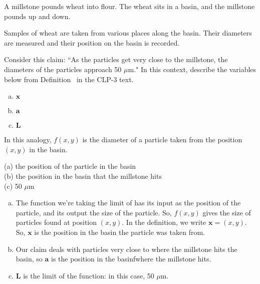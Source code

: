 \begin{question}
A millstone pounds wheat into flour. The wheat sits in a basin, and the millstone pounds up and down.

Samples of wheat are taken from various places along the basin. Their diameters are measured and their position on the basin is recorded.

Consider this claim: ``As the particles get very close to the millstone, the diameters of the particles approach 50 $\mu$m."
In this context, describe the variables below from Definition~ in the CLP-3 text.

\begin{enumerate}[(a)]
\item $\mathbf x$
\item $\mathbf a$
\item $\mathbf L$
\end{enumerate}
\end{question}
\begin{hint}
In this analogy, $f(x,y)$ is the diameter of a particle taken from the position $(x,y)$ in the basin.
\end{hint}
\begin{answer}
(a) the position of the particle in the basin \\
(b) the position in the basin that the millstone hits\\
(c) 50 $\mu$m
\end{answer}
\begin{solution}

\begin{enumerate}[(a)]
\item The function we're taking the limit of has its input as the position of the particle, and its output the size of the particle. So, $f(x,y)$ gives the size of particles found at position $(x,y)$. In the definition, we write $\mathbf x = (x,y)$. So, $\mathbf x$ is the position in the basin the particle was taken from.
\item Our claim deals with particles very close to where the millstone hits the basin, so $\mathbf a$ is the position in the basinfwhere the millstone hits.
\item $\mathbf L$ is the limit of the function: in this case, 50 $\mu$m.
\end{enumerate}

\end{solution}

